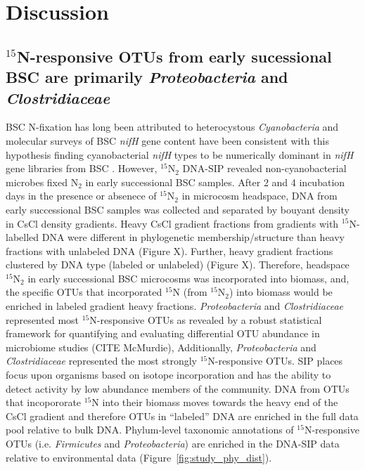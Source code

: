 \section{Discussion}
\subsection{$^{15}$N-responsive OTUs from early sucessional BSC are primarily
\textit{Proteobacteria} and \textit{Clostridiaceae}}
BSC N-fixation has long been attributed to heterocystous
\textit{Cyanobacteria} and molecular surveys of BSC \textit{nifH} gene content
have been consistent with this hypothesis finding cyanobacterial \textit{nifH}
types to be numerically dominant in \textit{nifH} gene libraries from BSC
\citep{Yeager,14766579,Yeager_2012}. However, $^{15}$N$_{2}$ DNA-SIP revealed
non-cyanobacterial microbes fixed N$_{2}$ in early successional BSC samples.
After 2 and 4 incubation days in the presence or absenece of $^{15}$N$_{2}$
in microcosm headspace, DNA from early successional BSC samples was collected
and separated by bouyant density in CsCl density gradients.
Heavy CsCl gradient fractions from gradients with $^{15}$N-labelled DNA were
different in phylogenetic membership/structure than heavy fractions with
unlabeled DNA (Figure X).  Further, heavy gradient fractions clustered by DNA
type (labeled or unlabeled) (Figure X). Therefore, headspace $^{15}$N$_{2}$ in
early successional BSC microcosms was incorporated into biomass, and, the
specific OTUs that incorporated $^{15}$N (from $^{15}$N$_{2}$) into biomass
would be enriched in labeled gradient heavy fractions. \textit{Proteobacteria}
and \textit{Clostridiaceae} represented most $^{15}$N-responsive OTUs as
revealed by a robust statistical framework for quantifying and evaluating
differential OTU abundance in microbiome studies (CITE McMurdie), Additionally,
\textit{Proteobacteria} and \textit{Clostridiaceae} represented the most
strongly $^{15}$N-responsive OTUs. SIP places focus upon organisms based on
isotope incorporation and has the ability to detect activity by low abundance
members of the community.  DNA from OTUs that incopororate $^{15}$N into their
biomass moves towards the heavy end of the CsCl gradient and therefore OTUs in
``labeled'' DNA are enriched in the full data pool relative to bulk DNA.
Phylum-level taxonomic annotations of $^{15}$N-responsive OTUs (i.e.
\textit{Firmicutes} and \textit{Proteobacteria}) are enriched in the DNA-SIP
data relative to environmental data (Figure~\ref{fig:study_phy_dist}).

